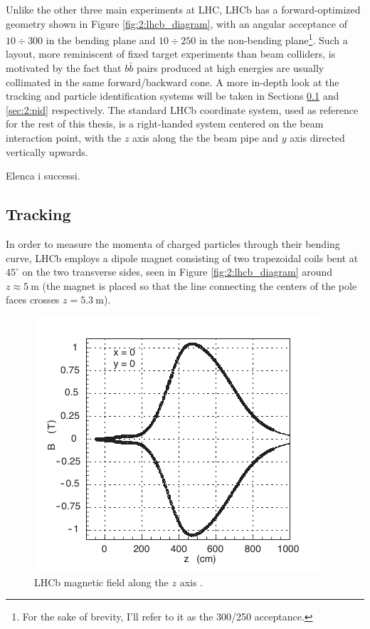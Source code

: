 Unlike the other three main experiments at LHC, LHCb has a forward-optimized geometry shown in Figure \ref{fig:2:lhcb_diagram}, with an angular acceptance of $10\div300$ \si{\mrad} in the bending plane and $10\div250$ \si{\mrad} in the non-bending plane\footnote{For the sake of brevity, I'll refer to it as the 300/250 \si{\mrad} acceptance.}.
Such a layout, more reminiscent of fixed target experiments than beam colliders, is motivated by the fact that $b\bar{b}$ pairs produced at high energies are usually collimated in the same forward/backward cone.
A more in-depth look at the tracking and particle identification systems will be taken in Sections \ref{sec:2:tracking} and \ref{sec:2:pid} respectively.
\label{info:LHCb_system}
The standard LHCb coordinate system, used as reference for the rest of this thesis, is a right-handed system centered on the beam interaction point, with the $z$ axis along the the beam pipe and $y$ axis directed vertically upwards.

Elenca i successi.

\subsection{Tracking}
\label{sec:2:tracking}
In order to measure the momenta of charged particles through their bending curve, LHCb employs a dipole magnet \cite{Amato:424338} consisting of two trapezoidal coils bent at $45^\circ$ on the two transverse sides, seen in Figure \ref{fig:2:lhcb_diagram} around $z\approx \SI{5}{\meter}$ (the magnet is placed so that the line connecting the centers of the pole faces crosses $z=\SI{5.3}{\meter}$).

\begin{figure}[t]
	\centering
	\includegraphics[width=.6\textwidth]{graphics/02-lhcb/b_field_map_z.png}
	\caption[LHCb magnetic field along the $z$ axis.]{LHCb magnetic field along the $z$ axis \cite{Amato:424338}.}
	\label{fig:2:b_field_map_z}
\end{figure}

